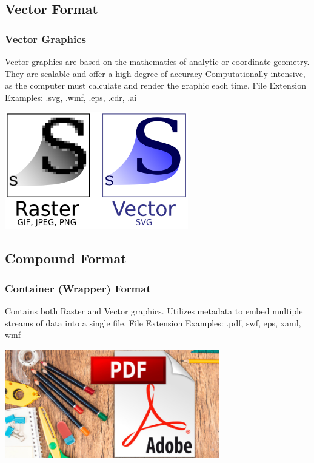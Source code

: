 \documentclass{beamer}
\begin{document}
\subsection{Vector Format}
\begin{frame}
	\frametitle{Vector Graphics}
		\begin{outline}
	\1 Vector graphics are based on the mathematics of analytic or coordinate geometry.  
	\1 They are scalable and offer a high degree of accuracy
	\1 Computationally intensive, as the computer must calculate and render the graphic each time.
	\1 File Extension Examples:  
	\2 .svg, .wmf, .eps, .cdr, .ai
\end{outline}
	\begin{center}
		\includegraphics[width = 0.6\textwidth]{images/Bitmap_VS_SVG.svg.png}
	\end{center}
\end{frame}

\subsection{Compound Format}
\begin{frame}
	\frametitle{Container (Wrapper) Format}
	\begin{outline}
		\1 Contains both Raster and Vector graphics.  
		\1 Utilizes metadata to embed multiple streams of data into a single file.
		\1 File Extension Examples:  
		\2 .pdf, swf, eps, xaml, wmf
	\end{outline}
	\begin{center}
		\includegraphics[width = 0.7\textwidth]{images/pdf.png}
	\end{center}
\end{frame}
\end{document}
